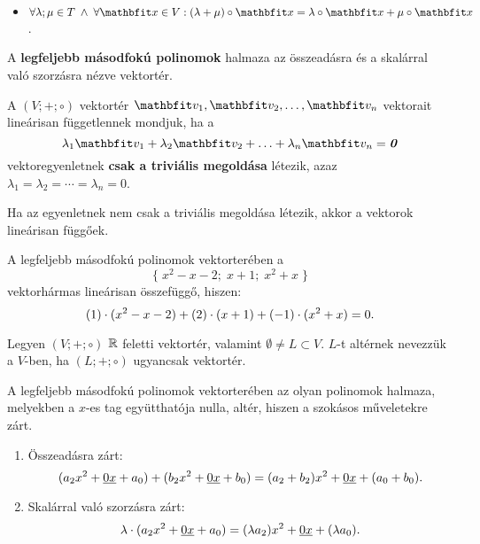 \documentclass{szb-practice}
\begin{document}
\begin{definition}[Vektortér]
\begin{enumerate}[itemsep=-.33em]
\begin{itemize}[itemsep=-.33em]
            \item $\forall \lambda; \mu \in T \; \land \; \forall \rvec x \in V:
                    (\lambda + \mu) \circ \rvec x
                    = \lambda \circ \rvec x + \mu \circ \rvec x$.
          \end{itemize}
  \end{enumerate}
\end{definition}

\begin{example}
  A \textbf{legfeljebb másodfokú polinomok} halmaza az összeadásra és a
  skalárral való szorzásra nézve vektortér.
\end{example}

\begin{definition}
  A $(V; +; \circ)$ vektortér $\rvec v_1, \rvec v_2, \ldots, \rvec v_n$
  vektorait lineárisan függetlennek mondjuk, ha a
  $$
    \lambda_1 \rvec v_1
    + \lambda_2 \rvec v_2
    + \ldots
    + \lambda_n \rvec v_n
    = \nvec
  $$
  vektoregyenletnek \textbf{csak a triviális megoldása} létezik, azaz
  $\lambda_1 = \lambda_2 = \cdots = \lambda_n = 0$.

  Ha az egyenletnek nem csak a triviális megoldása létezik, akkor a vektorok
  lineárisan függőek.
\end{definition}

\begin{example}[][nobreak]
  A legfeljebb másodfokú polinomok vektorterében a
  $$
    \Big\{\; x^2 - x - 2 ;\; x + 1 ;\; x^2 + x \;\Big\}
  $$
  vektorhármas lineárisan összefüggő, hiszen:
  $$
    (1) \cdot (x^2 - x - 2)
    + (2) \cdot (x + 1)
    + (-1) \cdot (x^2 + x)
    = 0
    \text.
  $$
\end{example}

\begin{definition}[Altér]
  Legyen $(V; +; \circ)$ $\mathbb{R}$ feletti vektortér, valamint
  $\emptyset \neq L \subset V$. $L$-t altérnek nevezzük a $V$-ben, ha
  $(L; +; \circ)$ ugyancsak vektortér.
\end{definition}

\begin{example}
  A legfeljebb másodfokú polinomok vektorterében az olyan polinomok halmaza,
  melyekben a $x$-es tag együtthatója nulla, altér, hiszen a szokásos
  műveletekre zárt.
  \begin{enumerate}
    \item Összeadásra zárt:
          $$
            (a_2 x^2 + \underline{0 x} + a_0) + (b_2 x^2 + \underline{0 x} + b_0)
            = (a_2 + b_2) x^2 + \underline{0 x} + (a_0 + b_0)
            \text.
          $$

    \item Skalárral való szorzásra zárt:
          $$
            \lambda \cdot (a_2 x^2 + \underline{0 x} + a_0)
            = (\lambda a_2) x^2 + \underline{0 x} + (\lambda a_0)
            \text.
          $$
  \end{enumerate}
\end{example}
\end{document}
